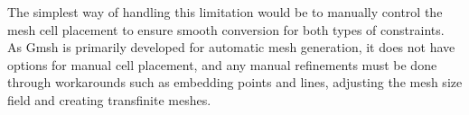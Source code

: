 The simplest way of handling this limitation would be to manually control the mesh cell placement to ensure smooth conversion for both types of constraints. As Gmsh is primarily developed for automatic mesh generation, it does not have options for manual cell placement, and any manual refinements must be done through workarounds such as embedding points and lines, adjusting the mesh size field and creating transfinite meshes.
